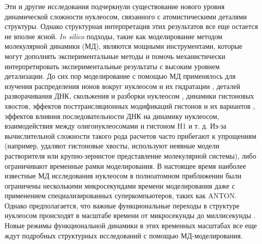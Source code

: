 Эти и другие исследования подчеркнули существование нового уровня динамической сложности нуклеосом, связанного с атомистическими деталями структуры. Однако структурная интерпретация этих результатов все еще остается не вполне ясной. \textit{In silico} подходы, такие как моделирование методом молекулярной динамики (МД), являются мощными инструментами, которые могут дополнять экспериментальные методы и помочь механистически интерпретировать экспериментальные результаты с высоким уровнем детализации. До сих пор моделирование с помощью МД применялось для изучения распределения ионов вокруг нуклеосом и их гидратации \cite{materese_counterion_2009}, деталей разворачивания ДНК, скольжения и разборки нуклеосом \cite{ettig_dissecting_2011, rychkov_partially_2017, zhang_exploring_2016, winogradoff_molecular_2019,brandani_dna_2018,lequieu_silico_2017}, динамики гистоновых хвостов\cite{erler_role_2014, shaytan_coupling_2016,chakraborty_molecular_2018,morrison_conformation_2018}, эффектов посттрансляционных модификаций гистонов \cite{fenley_modulation_2018,li_investigating_2018,rajagopalan_structural_2017} и их вариантов \cite{bowerman_unique_2019}, эффектов влияния последовательности ДНК \cite{sun_tmb_2019} на динамику нуклеосом, взаимодействия между олигонуклеосомами \cite{collepardo-guevara_chromatin_2015} и гистоном H1 \cite{ozturk_chromatosome_2020,perisic_sensitive_2019} и т. д. Из-за вычислительной сложности такого рода расчетов часто прибегают к упрощениям (например, удаляют гистоновые хвосты, используют неявные модели растворителя или крупно-зернистое представление молекулярной системы), либо ограничивают временные рамки моделирования. В настоящее время наиболее известные МД исследования нуклеосом в полноатомном приближении были ограничены несколькими микросекундами времени моделирования \cite{winogradoff_molecular_2019,chakraborty_molecular_2018} даже с применением специализированных суперкомпьютеров, таких как ANTON. Однако предполагается, что важные функциональные переходы в структуре нуклеосом происходят в масштабе времени от микросекунды до миллисекунды \cite{gansen_high_2018}. Новые режимы функциональной динамики в этих временных масштабах все еще ждут подробных структурных исследований с помощью МД-моделирования.

